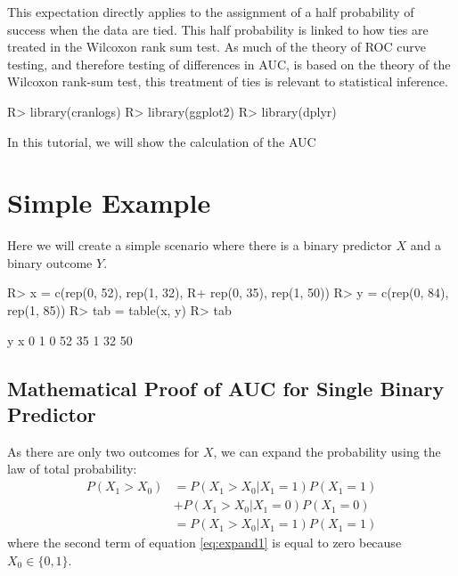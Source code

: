 \documentclass[article]{jss}
\begin{document}
This expectation directly applies to the assignment of a half
probability of success when the data are tied. This half probability is
linked to how ties are treated in the Wilcoxon rank sum test. As much of
the theory of ROC curve testing, and therefore testing of differences in
AUC, is based on the theory of the Wilcoxon rank-sum test, this
treatment of ties is relevant to statistical inference.

\begin{CodeChunk}

\begin{CodeInput}
R> library(cranlogs)
R> library(ggplot2)
R> library(dplyr)
\end{CodeInput}
\end{CodeChunk}

In this tutorial, we will show the calculation of the AUC

\hypertarget{simple-example}{%
\section{Simple Example}\label{simple-example}}

Here we will create a simple scenario where there is a binary predictor
\(X\) and a binary outcome \(Y\).\\

\begin{CodeChunk}

\begin{CodeInput}
R> x = c(rep(0, 52), rep(1, 32),
R+       rep(0, 35), rep(1, 50))
R> y = c(rep(0, 84), rep(1, 85))
R> tab = table(x, y)
R> tab
\end{CodeInput}

\begin{CodeOutput}
   y
x    0  1
  0 52 35
  1 32 50
\end{CodeOutput}
\end{CodeChunk}

\hypertarget{mathematical-proof-of-auc-for-single-binary-predictor}{%
\subsection{Mathematical Proof of AUC for Single Binary
Predictor}\label{mathematical-proof-of-auc-for-single-binary-predictor}}

As there are only two outcomes for \(X\), we can expand the probability
using the law of total probability: \begin{align}
P(X_{1} > X_{0}) &= P(X_{1} > X_{0} | X_{1} = 1) P(X_{1} = 1) \nonumber \\
&+ P(X_{1} > X_{0} | X_{1} = 0) P(X_{1} = 0) \label{eq:expand1} \\
&= P(X_{1} > X_{0} | X_{1} = 1) P(X_{1} = 1) \label{eq:expand}
\end{align} where the second term of equation \eqref{eq:expand1} is
equal to zero because \(X_{0} \in \{0, 1\}\).
\end{document}
